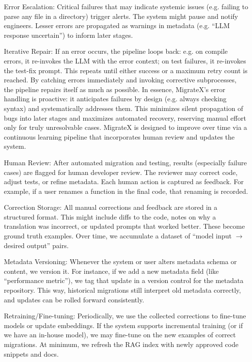 \documentclass[twocolumn]{article}
\begin{document}
{Error Escalation}: Critical failures that may indicate systemic issues (e.g. failing to parse any file in a directory) trigger alerts. The system might pause and notify engineers. Lesser errors are propagated as warnings in metadata (e.g. ``LLM response uncertain'') to inform later stages.

{Iterative Repair}: If an error occurs, the pipeline loops back: e.g. on compile errors, it re-invokes the LLM with the error context; on test failures, it re-invokes the test-fix prompt. This repeats until either success or a maximum retry count is reached. By catching errors immediately and invoking corrective subprocesses, the pipeline repairs itself as much as possible.
    In essence, MigrateX’s error handling is proactive: it anticipates failures by design (e.g. always checking syntax) and systematically addresses them. This minimizes silent propagation of bugs into later stages and maximizes automated recovery, reserving manual effort only for truly unresolvable cases.
    MigrateX is designed to improve over time via a continuous learning pipeline that incorporates human review and updates the system.

{Human Review}: After automated migration and testing, results (especially failure cases) are flagged for human developer review. The reviewer may correct code, adjust tests, or refine metadata. Each human action is captured as feedback. For example, if a user renames a function in the final code, that renaming is recorded.

{Correction Storage}: All manual corrections and feedback are stored in a structured format. This might include diffs to the code, notes on why a translation was incorrect, or updated prompts that worked better. These become ground truth examples. Over time, we accumulate a dataset of ``model input $\rightarrow$ desired output'' pairs.

{Metadata Versioning}: Whenever the system or user alters metadata schema or content, we version it. For instance, if we add a new metadata field (like ``performance metric''), we tag that update in a version control for the metadata repository. This way, historical migrations still interpret old metadata correctly, and updates can be rolled forward consistently.

{Retraining/Fine-tuning}: Periodically, we use the collected corrections to fine-tune models or update embeddings. If the system supports incremental training (or if we have an in-house model), we may fine-tune on the new examples of correct migrations. At minimum, we refresh the RAG index with newly approved code snippets and docs.
\end{document}
